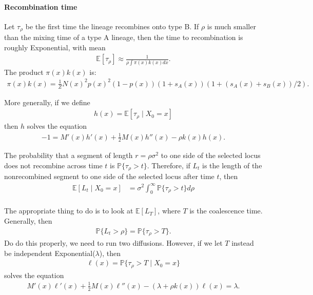 \documentclass{article}
\newcommand{\E}{\mathbb{E}}
\renewcommand{\P}{\mathbb{P}}
\newcommand{\given}{\;\vert\;}
\begin{document}
\paragraph{Recombination time}
Let $\tau_\rho$ be the first time  the lineage recombines onto type B.
If $\rho$ is much smaller than the mixing time of a type A lineage,
then the time to recombination is roughly Exponential,
with mean
\begin{align}
    \E[\tau_\rho] \approx \frac{1}{ \rho \int \pi(x) k(x) dx } .
\end{align}
The product $\pi(x) k(x)$ is:
\begin{align}
    \pi(x) k(x) = \frac{1}{Z} N(x)^2 p(x)^2 (1-p(x)) (1+s_A(x)) (1+(s_A(x)+s_B(x))/2) .
\end{align}

More generally, if we define
\begin{align}
    h(x) = \E[\tau_\rho \given X_0 = x]
\end{align}
then $h$ solves the equation
\begin{align}
    -1 = M'(x) h'(x) + \frac{1}{2} M(x) h''(x) - \rho k(x) h(x) .
\end{align}

The probability that a segment of length $r = \rho \sigma^2$ to one side of the selected locus
does not recombine across time $t$ is $\P\{\tau_\rho > t\}$.
Therefore, if $L_t$ is the length of the nonrecombined segment to one side of the selected locus
after time $t$, then
\begin{align}
    \E[ L_t \given X_0=x ] &= \sigma^2 \int_0^\infty \P\{ \tau_\rho > t \} d\rho \\
\end{align}

The appropriate thing to do is to look at $\E[L_T]$, where $T$ is the coalescence time.
Generally, then
\begin{align}
  \P\{ L_t > \rho \} = \P\{ \tau_\rho > T \} .
\end{align}
Do do this properly, we need to run two diffusions.
However, if we let $T$ instead be independent Exponential($\lambda$), then 
\begin{align}
  \ell(x) = \P\{ \tau_\rho > T \given X_0 = x\} 
\end{align}
solves the equation
\begin{align}
  M'(x) \ell'(x) + \frac{1}{2} M(x) \ell''(x) - (\lambda + \rho k(x) ) \ell(x) = \lambda .
\end{align}
\end{document}
